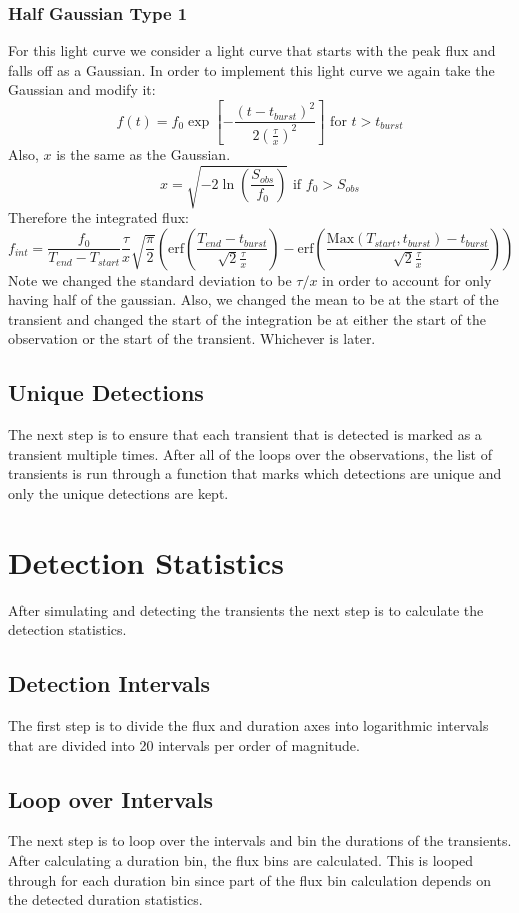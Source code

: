 \documentclass{article}
\begin{document}
\subsubsection{Half Gaussian Type 1}
For this light curve we consider a light curve that starts with the peak flux and falls off as a Gaussian. In order to implement this light curve we again take the Gaussian and modify it:
\[f(t) = f_0  \exp[-\frac{(t-t_{burst})^2}{2(\frac{\tau}{x})^2}]\text{ for }t>t_{burst}\]
Also, $x$ is the same as the Gaussian. 
\[x=\sqrt{-2\ln(\frac{S_{obs}}{f_0})}\text{ if }f_0>S_{obs}\]
Therefore the integrated flux:
\[f_{int} = \frac{f_0}{T_{end}-T_{start}} \frac{\tau}{x}\sqrt{\frac{\pi}{2}}(\text{erf}(\frac{T_{end}-t_{burst}}{\sqrt{2}\frac{\tau}{x}})-\text{erf}(\frac{\text{Max}(T_{start},t_{burst})-t_{burst}}{\sqrt{2}\frac{\tau}{x}}))\]
Note we changed the standard deviation to be $\tau/x$ in order to account for only having half of the gaussian. Also, we changed the mean to be at the start of the transient and changed the start of the integration be at either the start of the observation or the start of the transient. Whichever is later.
\subsection{Unique Detections}
The next step is to ensure that each transient that is detected is marked as a transient multiple times. After all of the loops over the observations, the list of transients is run through a function that marks which detections are unique and only the unique detections are kept.

\section{Detection Statistics}
After simulating and detecting the transients the next step is to calculate the detection statistics. 

\subsection{Detection Intervals}
The first step is to divide the flux and duration axes into logarithmic intervals that are divided into 20 intervals per order of magnitude. 
\subsection{Loop over Intervals}
The next step is to loop over the intervals and bin the durations of the transients. After calculating a duration bin, the flux bins are calculated. This is looped through for each duration bin since part of the flux bin calculation depends on the detected duration statistics. 
\end{document}
